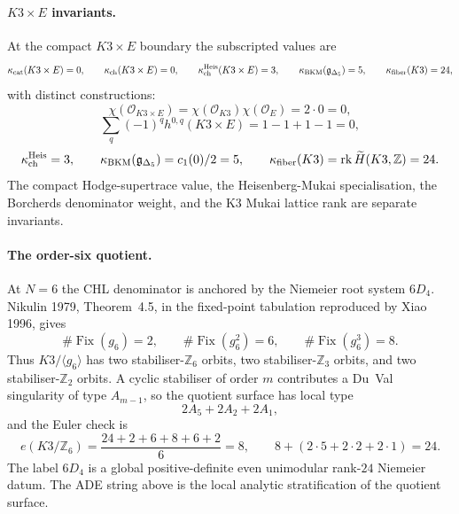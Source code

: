 \paragraph{\texorpdfstring{$K3\times E$}{K3xE} invariants.}
At the compact $K3\times E$ boundary the subscripted values are
\[
  \kappa_{\mathrm{cat}}(K3\times E)=0,\qquad
  \kappa_{\mathrm{ch}}(K3\times E)=0,\qquad
  \kappa_{\mathrm{ch}}^{\mathrm{Heis}}(K3\times E)=3,\qquad
  \kappa_{\mathrm{BKM}}(\mathfrak{g}_{\Delta_5})=5,\qquad
  \kappa_{\mathrm{fiber}}(K3)=24,
\]
with distinct constructions:
\[
  \chi(\mathcal O_{K3\times E})
  =\chi(\mathcal O_{K3})\chi(\mathcal O_E)=2\cdot0=0,
\]
\[
  \sum_q(-1)^q h^{0,q}(K3\times E)=1-1+1-1=0,
\]
\[
  \kappa_{\mathrm{ch}}^{\mathrm{Heis}}=3,\qquad
  \kappa_{\mathrm{BKM}}(\mathfrak{g}_{\Delta_5})=c_1(0)/2=5,\qquad
  \kappa_{\mathrm{fiber}}(K3)=\operatorname{rk}\widetilde H(K3,\mathbb Z)=24.
\]
The compact Hodge-supertrace value, the Heisenberg-Mukai
specialisation, the Borcherds denominator weight, and the K3 Mukai
lattice rank are separate invariants.

\paragraph{The order-six quotient.}
At $N=6$ the CHL denominator is anchored by the Niemeier root system
$6D_4$. Nikulin 1979, Theorem~4.5, in the fixed-point tabulation
reproduced by Xiao 1996, gives
\[
  \#\operatorname{Fix}(g_6)=2,\qquad
  \#\operatorname{Fix}(g_6^2)=6,\qquad
  \#\operatorname{Fix}(g_6^3)=8.
\]
Thus $K3/\langle g_6\rangle$ has two stabiliser-$\mathbb Z_6$ orbits,
two stabiliser-$\mathbb Z_3$ orbits, and two
stabiliser-$\mathbb Z_2$ orbits. A cyclic stabiliser of order $m$
contributes a Du~Val singularity of type $A_{m-1}$, so the quotient
surface has local type
\[
  2A_5+2A_2+2A_1,
\]
and the Euler check is
\[
  e(K3/\mathbb Z_6)=\frac{24+2+6+8+6+2}{6}=8,\qquad
  8+(2\cdot5+2\cdot2+2\cdot1)=24.
\]
The label $6D_4$ is a global positive-definite even unimodular
rank-$24$ Niemeier datum. The ADE string above is the local analytic
stratification of the quotient surface.

